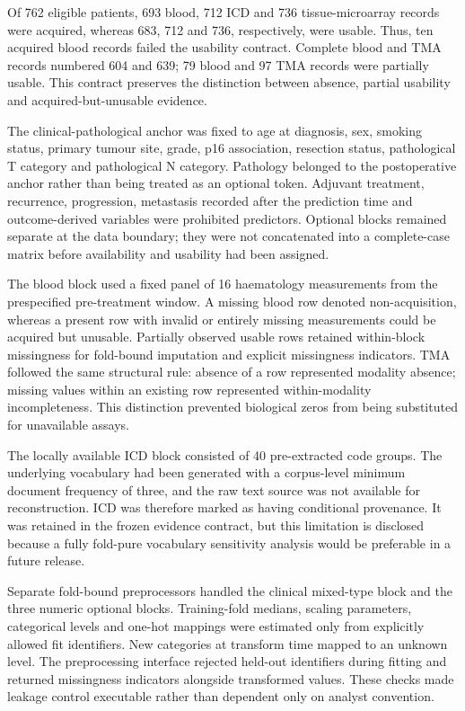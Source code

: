 Of 762 eligible patients, 693 blood, 712 ICD and 736 tissue-microarray records were acquired, whereas 683, 712 and 736, respectively, were usable. Thus, ten acquired blood records failed the usability contract. Complete blood and TMA records numbered 604 and 639; 79 blood and 97 TMA records were partially usable. This contract preserves the distinction between absence, partial usability and acquired-but-unusable evidence.

The clinical-pathological anchor was fixed to age at diagnosis, sex, smoking status, primary tumour site, grade, p16 association, resection status, pathological T category and pathological N category. Pathology belonged to the postoperative anchor rather than being treated as an optional token. Adjuvant treatment, recurrence, progression, metastasis recorded after the prediction time and outcome-derived variables were prohibited predictors. Optional blocks remained separate at the data boundary; they were not concatenated into a complete-case matrix before availability and usability had been assigned.

The blood block used a fixed panel of 16 haematology measurements from the prespecified pre-treatment window. A missing blood row denoted non-acquisition, whereas a present row with invalid or entirely missing measurements could be acquired but unusable. Partially observed usable rows retained within-block missingness for fold-bound imputation and explicit missingness indicators. TMA followed the same structural rule: absence of a row represented modality absence; missing values within an existing row represented within-modality incompleteness. This distinction prevented biological zeros from being substituted for unavailable assays.

The locally available ICD block consisted of 40 pre-extracted code groups. The underlying vocabulary had been generated with a corpus-level minimum document frequency of three, and the raw text source was not available for reconstruction. ICD was therefore marked as having conditional provenance. It was retained in the frozen evidence contract, but this limitation is disclosed because a fully fold-pure vocabulary sensitivity analysis would be preferable in a future release.

Separate fold-bound preprocessors handled the clinical mixed-type block and the three numeric optional blocks. Training-fold medians, scaling parameters, categorical levels and one-hot mappings were estimated only from explicitly allowed fit identifiers. New categories at transform time mapped to an unknown level. The preprocessing interface rejected held-out identifiers during fitting and returned missingness indicators alongside transformed values. These checks made leakage control executable rather than dependent only on analyst convention.

